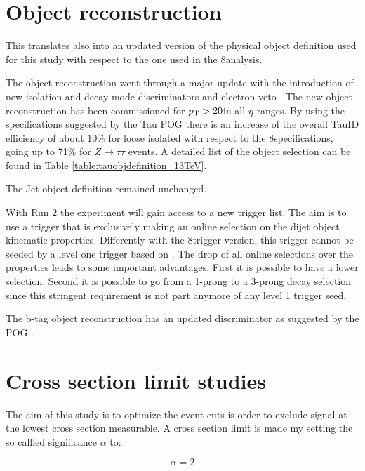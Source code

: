 \section{Object reconstruction}

This translates also into an updated version of the physical object definition used for this study with respect to the one used in the 8\tev analysis.

The \hadtau object reconstruction went through a major update with the introduction of new isolation and decay mode discriminators and electron veto \cite{bib:TauID_13tev}. The new \hadtau object reconstruction has been commissioned for $p_{\text{T}} > 20$\gev in all $\eta$ ranges. By using the specifications suggested by the Tau POG there is an increase of the overall TauID efficiency of about 10\% for loose isolated \hadtau with respect to the 8\tev specifications, going up to 71\% for $Z \longrightarrow\tau\tau$ events\cite{bib:TauID_13tev}. A detailed list of the \hadtau object selection can be found in Table \ref{table:tauobjdefinition_13TeV}. 

The Jet object definition remained unchanged.  

With Run 2 the experiment will gain access to a new trigger list. The aim is to use a trigger that is exclusively making an online selection on the dijet object kinematic properties. Differently with the 8\tev trigger version, this trigger cannot be seeded by a level one trigger based on \met. The drop of all online selections over the \hadtau properties leads to some important advantages. First it is possible to have a lower \hadtau \pt selection. Second it is possible to go from a 1-prong to a 3-prong decay selection since this stringent requirement is not part anymore of any level 1 trigger seed. 

The b-tag object reconstruction has an updated discriminator as suggested by the POG \cite{bib:BJetID_13tev}.

\section{Cross section limit studies}

The aim of this study is to optimize the event cuts is order to exclude signal at the lowest cross section measurable. A cross section limit is made my setting the so callled significance $\alpha$ to:

\begin{equation}
\alpha = 2
\label{eq::significance_xsec_limit}
\end{equation}


